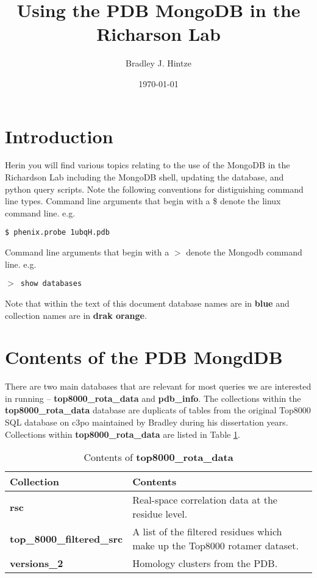 \documentclass[12pt]{article}
\title{Using the PDB MongoDB in the Richarson Lab}
\author{Bradley J. Hintze}
\date{\today}
\newcommand{\cmdline}[1]{\vspace{5mm} \noindent
\texttt{\$ #1}
\vspace{5mm}

}
\newcommand{\mdbcmdline}[1]{\vspace{5mm} \noindent
\texttt{$>$ #1}
\vspace{5mm}

}
\newcommand{\mdbdb}[1]{{\color{BlueViolet}\textbf{#1}}}
\newcommand{\mdbcol}[1]{{\color{Bittersweet}\textbf{#1}}}
\begin{document}
\maketitle
\tableofcontents
\newpage

\section{Introduction}
Herin you will find various topics relating to the use of the MongoDB in the Richardson Lab including the MongoDB shell, updating the database, and python query scripts.
Note the following conventions for distiguishing command line types.
Command line arguments that begin with a \$ denote the linux command line. e.g.

\cmdline{phenix.probe 1ubqH.pdb}
\noindent
Command line arguments that begin with a $>$ denote the Mongodb command line. e.g.

\mdbcmdline{show databases}

\noindent
Note that within the text of this document database names are in \mdbdb{blue} and collection names are in \mdbcol{drak orange}.

\section{Contents of the PDB MongdDB}
\label{sec:MongoDBContents}
There are two main databases that are relevant for most queries we are interested in running -- \mdbdb{top8000\_rota\_data} and \mdbdb{pdb\_info}.
The collections within the \mdbdb{top8000\_rota\_data} database are duplicats of tables from the original Top8000 SQL database on c3po maintained by Bradley during his dissertation years.
Collections within \mdbdb{top8000\_rota\_data} are listed in Table \ref{tab:T8kDB}.

\begin{table}[h]
\caption{Contents of \mdbdb{top8000\_rota\_data}}
\begin{tabular}{l|p{9cm}}
  \textbf{Collection} & \textbf{Contents} \\ \hline
  \mdbcol{rsc} & Real-space correlation data at the residue level. \\ \hline
  \mdbcol{top\_8000\_filtered\_src} & A list of the filtered residues which make up the Top8000 rotamer dataset. \\ 
   \mdbcol{versions\_2} & Homology clusters from the PDB. \\ \hline
\end{tabular}
\label{tab:T8kDB}
\end{table}
\end{document}
